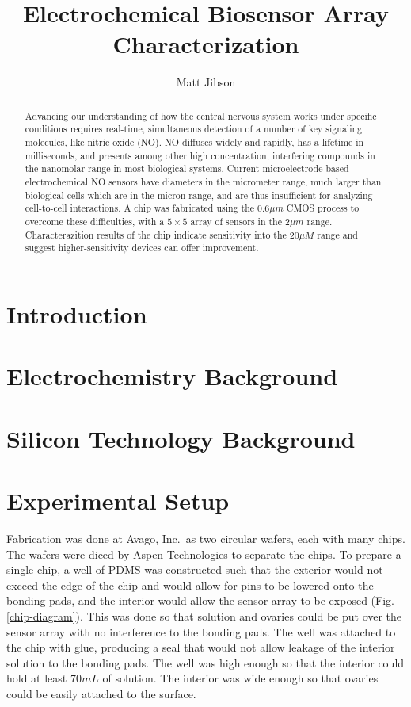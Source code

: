 \documentclass[twocolumn]{article}
\begin{document}
\title{Electrochemical Biosensor Array Characterization}
\author{Matt Jibson}

\maketitle{}

\begin{abstract}

Advancing our understanding of how the central nervous system works under specific conditions requires real-time, simultaneous detection of a number of key signaling molecules, like nitric oxide (NO). NO diffuses widely and rapidly, has a lifetime in milliseconds, and presents among other high concentration, interfering compounds in the nanomolar range in most biological systems. Current microelectrode-based electrochemical NO sensors have diameters in the micrometer range, much larger than biological cells which are in the micron range, and are thus insufficient for analyzing cell-to-cell interactions. A chip was fabricated using the $0.6\mu m$ CMOS process to overcome these difficulties, with a $5 \times 5$ array of sensors in the 2$\mu m$ range. Characterazition results of the chip indicate sensitivity into the 20$\mu M$ range and suggest higher-sensitivity devices can offer improvement.

\end{abstract}

\section{Introduction}

\section{Electrochemistry Background}

\section{Silicon Technology Background}

\section{Experimental Setup}

Fabrication was done at Avago, Inc.\ as two circular wafers, each with many chips. The wafers were diced by Aspen Technologies to separate the chips. To prepare a single chip, a well of PDMS was constructed such that the exterior would not exceed the edge of the chip and would allow for pins to be lowered onto the bonding pads, and the interior would allow the sensor array to be exposed (Fig. \ref{chip-diagram}). This was done so that solution and ovaries could be put over the sensor array with no interference to the bonding pads. The well was attached to the chip with glue, producing a seal that would not allow leakage of the interior solution to the bonding pads. The well was high enough so that the interior could hold at least 70$mL$ of solution. The interior was wide enough so that ovaries could be easily attached to the surface.
\end{document}
